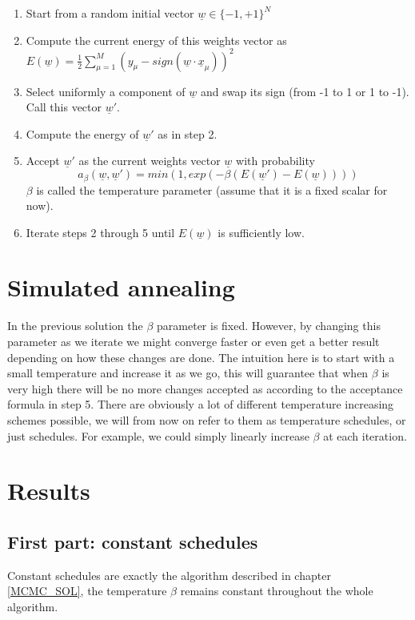 \documentclass[a4paper]{article}
\begin{document}
\begin{enumerate}
\item Start from a random initial vector $\underline{w} \in \{-1, +1\}^{N}$
\item Compute the current energy of this weights vector as $E(\underline{w}) = \frac{1}{2} \sum_{\mu = 1}^{M} (y_{\mu} - sign(\underline{w} \cdot \underline{x}_{\mu}))^2$
\item Select uniformly a component of $\underline{w}$ and swap its sign (from -1 to 1 or 1 to -1). Call this vector $\underline{w}'$.
\item Compute the energy of $\underline{w}'$ as in step 2. 
\item Accept $\underline{w}'$ as the current weights vector  $\underline{w}$ with probability \[a_{\beta}(\underline{w}, \underline{w}') = min(1, exp(-\beta(E(\underline{w}') - E(\underline{w}))))\] $\beta$ is called the temperature parameter (assume that it is a fixed scalar for now).
\item Iterate steps 2 through 5 until $E(\underline{w})$ is sufficiently low.
\end{enumerate}

\section{Simulated annealing}

In the previous solution the $\beta$ parameter is fixed. However, by changing this parameter as we iterate we might converge faster or even get a better result depending on how these changes are done. The intuition here is to start with a small temperature and increase it as we go, this will guarantee that when $\beta$ is very high there will be no more changes accepted as according to the acceptance formula in step 5.
There are obviously a lot of different temperature increasing schemes possible, we will from now on refer to them as temperature schedules, or just schedules. For example, we could simply linearly increase $\beta$ at each iteration.

\section{Results}
\subsection{First part: constant schedules}

Constant schedules are exactly the algorithm described in chapter \ref{MCMC_SOL}, the temperature $\beta$ remains constant throughout the whole algorithm.
\end{document}
